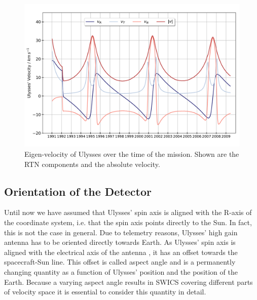 \begin{figure}[h]
	\includegraphics[width=1.\textwidth]{Figures/eigenv.pdf}
	\centering
	\caption{Eigen-velocity of Ulysses over the time of the mission. Shown are the RTN components and the absolute velocity.}
	\label{fig:eigenv}
\end{figure}




\subsection{Orientation of the Detector}
Until now we have assumed that Ulysses' spin axis is aligned with the R-axis of the coordinate system, i.e. that the spin axis points directly to the Sun. In fact, this is not the case in general. Due to telemetry reasons, Ulysses' high gain antenna has to be oriented directly towards Earth. As Ulysses' spin axis is aligned with the electrical axis of the antenna \citep{wenzel_ulysses}, it has an offset towards the spacecraft-Sun line. This offset is called aspect angle and is a permanently changing quantity as a function of Ulysses' position and the position of the Earth. Because a varying aspect angle results in SWICS covering different parts of velocity space it is essential to consider this quantity in detail.
%
%
